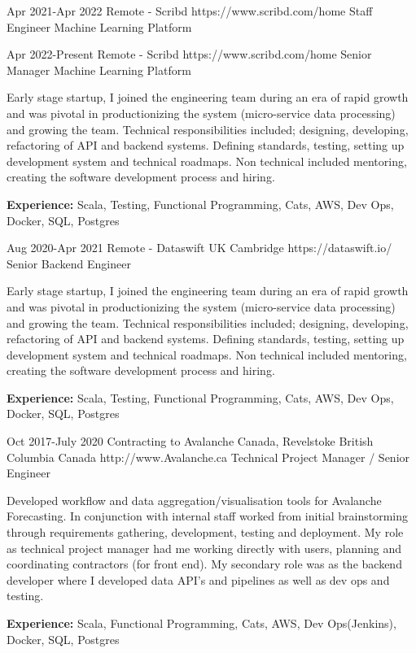 \documentclass{article}
\begin{document}
\begin{job}
{Apr 2021-}{Apr 2022}
{Remote - Scribd}
{https://www.scribd.com/home}
{Staff Engineer Machine Learning Platform}%

{Apr 2022-}{Present}
{Remote - Scribd}
{https://www.scribd.com/home}
{Senior Manager Machine Learning Platform}%


{Early stage startup, I joined the engineering team during an era of rapid growth and was pivotal in productionizing the system (micro-service data processing) and growing the team. Technical responsibilities included; designing, developing, refactoring of API and backend systems. Defining standards, testing, setting up development system and technical roadmaps. Non technical included  mentoring, creating the software development process and hiring.  \\
\rule{0mm}{5mm}\textbf{Experience:} Scala, Testing, Functional Programming, Cats, AWS, Dev Ops, Docker, SQL, Postgres}
\end{job}

\begin{job}
{Aug 2020-}{Apr 2021}
{Remote - Dataswift UK Cambridge}
{https://dataswift.io/}
{Senior Backend Engineer}%
{Early stage startup, I joined the engineering team during an era of rapid growth and was pivotal in productionizing the system (micro-service data processing) and growing the team. Technical responsibilities included; designing, developing, refactoring of API and backend systems. Defining standards, testing, setting up development system and technical roadmaps. Non technical included  mentoring, creating the software development process and hiring.  \\
\rule{0mm}{5mm}\textbf{Experience:} Scala, Testing, Functional Programming, Cats, AWS, Dev Ops, Docker, SQL, Postgres}
\end{job}

\begin{job}
{Oct 2017-}{July 2020}
{Contracting to Avalanche Canada, Revelstoke British Columbia Canada}
{http://www.Avalanche.ca}
{Technical Project Manager / Senior Engineer}%
{Developed workflow and data aggregation/visualisation tools for Avalanche Forecasting. In conjunction with internal staff worked from initial brainstorming through requirements gathering, development, testing and deployment. My role as technical project manager had me working directly with users, planning and coordinating contractors (for front end). My secondary role was as the backend developer where I developed data API's and pipelines as well as dev ops and testing.\\
\rule{0mm}{5mm}\textbf{Experience:} Scala, Functional Programming, Cats, AWS, Dev Ops(Jenkins), Docker, SQL, Postgres}
\end{job}
\end{document}
